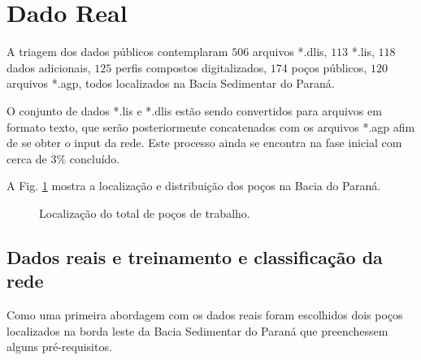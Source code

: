 \section{Dado Real}

A triagem dos dados públicos contemplaram  $506$ arquivos *.dlis, $113$ *.lis, $118$ dados adicionais, $125$ perfis compostos digitalizados, $174$ poços públicos, $120$ arquivos *.agp, todos localizados na Bacia Sedimentar do Paraná. 

O conjunto de dados *.lis e *.dlis estão sendo convertidos para arquivos em formato texto, que serão posteriormente concatenados  com os arquivos *.agp afim de se obter o input da rede. Este processo ainda se encontra na fase inicial com cerca de $3\%$ concluído.

A Fig. \ref{real} mostra a localização e distribuição dos poços na Bacia do Paraná.

\begin{figure}[H]
	\centering
	\setlength{\fboxsep}{8pt}
	\setlength{\fboxrule}{0.1pt}
	\caption{Localização do total de poços de trabalho.}
	\label{real}
\end{figure}

\subsection{Dados reais e treinamento e classificação da rede}

Como uma primeira abordagem com os dados reais foram escolhidos dois poços localizados na borda leste da Bacia Sedimentar do Paraná que preenchessem alguns pré-requisitos.

